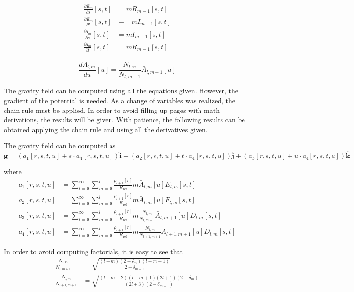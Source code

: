 \begin{align}
	\frac{\partial R_m}{\partial s}[s,t] &= m R_{m-1}[s,t]\\
	\frac{\partial R_m}{\partial t}[s,t] &= -m I_{m-1}[s,t]\\
	\frac{\partial I_m}{\partial s}[s,t] &= m I_{m-1}[s,t]\\
	\frac{\partial I_m}{\partial t}[s,t] &= m R_{m-1}[s,t]
\end{align}

\begin{equation}
\frac{d \bar A_{l,m}}{d u}[u] = \frac{N_{l,m}}{N_{l,m+1}} \bar A_{l,m+1}[u]
\end{equation}

The gravity field can be computed using all the equations given. However, the gradient of the potential is needed. As a change of variables was realized, the chain rule must be applied. In order to avoid filling up pages with math derivations, the results will be given. With patience, the following results can be obtained applying the chain rule and using all the derivatives given.

The gravity field can be computed as
\begin{equation}
\mathbf{\bar g} = (a_1[r,s,t,u] + s \cdot a_4[r,s,t,u]) \mathbf{\hat i} + (a_2[r,s,t,u] + t \cdot a_4[r,s,t,u]) \mathbf{\hat j} + (a_3[r,s,t,u] + u \cdot a_4[r,s,t,u]) \mathbf{\hat k}
\end{equation}

where
\begin{align}
	a_1[r,s,t,u] &= \sum_{l=0}^\infty \sum_{m=0}^l \frac{\rho_{l+1}[r]}{R_{\text{ref}}} m \bar A_{l,m}[u] E_{l,m}[s,t]\\
	a_2[r,s,t,u] &= \sum_{l=0}^\infty \sum_{m=0}^l \frac{\rho_{l+1}[r]}{R_{\text{ref}}} m \bar A_{l,m}[u] F_{l,m}[s,t]\\
	a_3[r,s,t,u] &= \sum_{l=0}^\infty \sum_{m=0}^l \frac{\rho_{l+1}[r]}{R_{\text{ref}}} m \frac{N_{l,m}}{N_{l,m+1}} \bar A_{l,m+1}[u] D_{l,m}[s,t]\\
	a_4[r,s,t,u] &= \sum_{l=0}^\infty \sum_{m=0}^l \frac{\rho_{l+1}[r]}{R_{\text{ref}}} m \frac{N_{l,m}}{N_{l+1,m+1}} \bar A_{l+1,m+1}[u] D_{l,m}[s,t]
\end{align}

In order to avoid computing factorials, it is easy to see that
\begin{align}
	\frac{N_{l,m}}{N_{l,m+1}} &= \sqrt{\frac{(l-m) (2-\delta_m)(l+m+1)}{2- \delta_{m+1}}}\\
	\frac{N_{l,m}}{N_{l+1,m+1}} &= \sqrt{\frac{(l+m+2)(l+m+1)(2l+1)(2-\delta_m)}{(2l+3)(2-\delta_{m+1})}}
\end{align}

